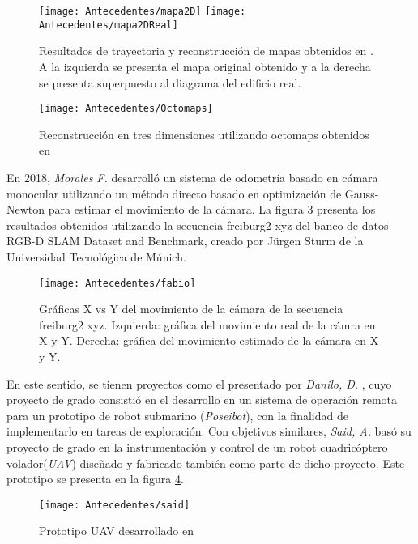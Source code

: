 \begin{figure}[H]
	\centering
	\texttt{[image: Antecedentes/mapa2D]}
	\texttt{[image: Antecedentes/mapa2DReal]}
	\caption{Resultados de trayectoria y reconstrucción de mapas obtenidos en \cite{manuel}. A la izquierda se presenta el mapa original obtenido y a la derecha se presenta superpuesto al diagrama del edificio real.}
	\label{imagen:Antecedentes/mapa2D}
\end{figure}


\begin{figure}[H]
	\centering
	\texttt{[image: Antecedentes/Octomaps]}
	\caption{Reconstrucción en tres dimensiones utilizando octomaps obtenidos
		en  \cite{manuel}}
	\label{imagen:Antecedentes/octomaps}
\end{figure}

En 2018,  \textit{Morales F.} \cite{fabio} desarrolló un sistema de odometría basado en cámara monocular utilizando un método directo basado en optimización de Gauss-Newton para estimar el movimiento de la cámara. La figura \ref{imagen:Antecedentes/fabio} presenta los resultados obtenidos utilizando la secuencia freiburg2 xyz del banco de datos RGB-D SLAM Dataset and Benchmark, creado por Jürgen
Sturm de la Universidad Tecnológica de Múnich.

\begin{figure}[H]
	\centering
	\texttt{[image: Antecedentes/fabio]}
	\caption{Gráficas X vs Y del movimiento de la cámara de la secuencia
		freiburg2 xyz. Izquierda: gráfica del movimiento real de la cámra en X y Y.
		Derecha: gráfica del movimiento estimado de la cámara en X y Y.}
	\label{imagen:Antecedentes/fabio}
\end{figure}

 En este sentido, se tienen proyectos como el presentado por \textit{Danilo, D.} \cite{danilo}, cuyo proyecto de grado consistió en el desarrollo en un sistema de operación remota para un prototipo de robot submarino (\textit{Poseibot}), con la finalidad de implementarlo en tareas de exploración. Con objetivos similares, \textit{Said, A.} \cite{said} basó su proyecto de grado en la instrumentación y control de un robot cuadricóptero volador(\textit{UAV}) diseñado y fabricado también como parte de dicho proyecto. Este prototipo se presenta en la figura \ref{imagen:said}.
\begin{figure}[H]
	\centering
	\texttt{[image: Antecedentes/said]}
	\caption{Prototipo UAV desarrollado en  \cite{said}}
	\label{imagen:said}
\end{figure}

